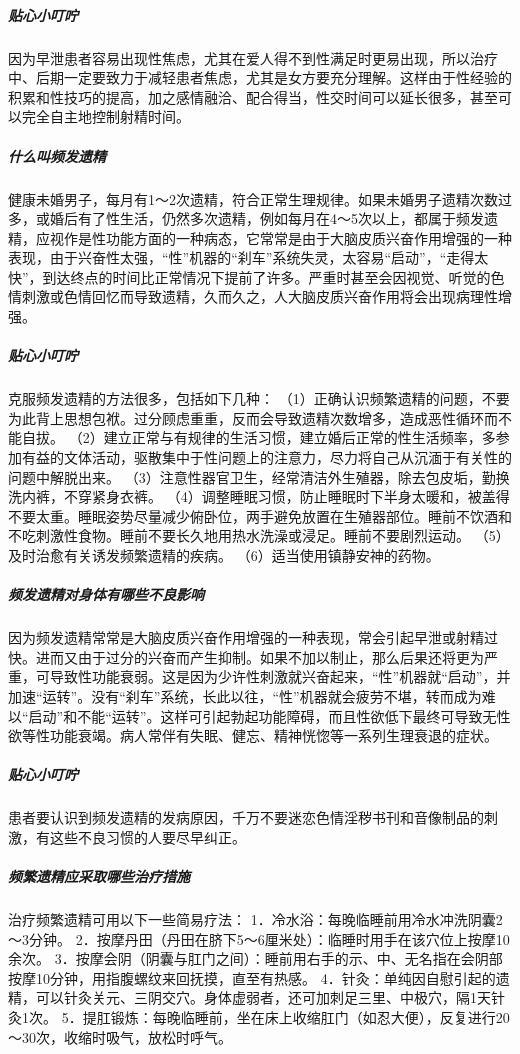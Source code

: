 \subparagraph{贴心小叮咛}

因为早泄患者容易出现性焦虑，尤其在爱人得不到性满足时更易出现，所以治疗中、后期一定要致力于减轻患者焦虑，尤其是女方要充分理解。这样由于性经验的积累和性技巧的提高，加之感情融洽、配合得当，性交时间可以延长很多，甚至可以完全自主地控制射精时间。

\subparagraph{什么叫频发遗精}

健康未婚男子，每月有1～2次遗精，符合正常生理规律。如果未婚男子遗精次数过多，或婚后有了性生活，仍然多次遗精，例如每月在4～5次以上，都属于频发遗精，应视作是性功能方面的一种病态，它常常是由于大脑皮质兴奋作用增强的一种表现，由于兴奋性太强，“性”机器的“刹车”系统失灵，太容易“启动”，“走得太快”，到达终点的时间比正常情况下提前了许多。严重时甚至会因视觉、听觉的色情刺激或色情回忆而导致遗精，久而久之，人大脑皮质兴奋作用将会出现病理性增强。

\subparagraph{贴心小叮咛}

克服频发遗精的方法很多，包括如下几种：
（1）正确认识频繁遗精的问题，不要为此背上思想包袱。过分顾虑重重，反而会导致遗精次数增多，造成恶性循环而不能自拔。
（2）建立正常与有规律的生活习惯，建立婚后正常的性生活频率，多参加有益的文体活动，驱散集中于性问题上的注意力，尽力将自己从沉湎于有关性的问题中解脱出来。
（3）注意性器官卫生，经常清洁外生殖器，除去包皮垢，勤换洗内裤，不穿紧身衣裤。
（4）调整睡眠习惯，防止睡眠时下半身太暖和，被盖得不要太重。睡眠姿势尽量减少俯卧位，两手避免放置在生殖器部位。睡前不饮酒和不吃刺激性食物。睡前不要长久地用热水洗澡或浸足。睡前不要剧烈运动。
（5）及时治愈有关诱发频繁遗精的疾病。
（6）适当使用镇静安神的药物。

\subparagraph{频发遗精对身体有哪些不良影响}

因为频发遗精常常是大脑皮质兴奋作用增强的一种表现，常会引起早泄或射精过快。进而又由于过分的兴奋而产生抑制。如果不加以制止，那么后果还将更为严重，可导致性功能衰弱。这是因为少许性刺激就兴奋起来，“性”机器就“启动”，并加速“运转”。没有“刹车”系统，长此以往，“性”机器就会疲劳不堪，转而成为难以“启动”和不能“运转”。这样可引起勃起功能障碍，而且性欲低下最终可导致无性欲等性功能衰竭。病人常伴有失眠、健忘、精神恍惚等一系列生理衰退的症状。

\subparagraph{贴心小叮咛}

患者要认识到频发遗精的发病原因，千万不要迷恋色情淫秽书刊和音像制品的刺激，有这些不良习惯的人要尽早纠正。

\subparagraph{频繁遗精应采取哪些治疗措施}

治疗频繁遗精可用以下一些简易疗法：
1．冷水浴：每晚临睡前用冷水冲洗阴囊2～3分钟。
2．按摩丹田（丹田在脐下5～6厘米处）：临睡时用手在该穴位上按摩10余次。
3．按摩会阴（阴囊与肛门之间）：睡前用右手的示、中、无名指在会阴部按摩10分钟，用指腹螺纹来回抚摸，直至有热感。
4．针灸：单纯因自慰引起的遗精，可以针灸关元、三阴交穴。身体虚弱者，还可加刺足三里、中极穴，隔1天针灸1次。
5．提肛锻炼：每晚临睡前，坐在床上收缩肛门（如忍大便），反复进行20～30次，收缩时吸气，放松时呼气。

